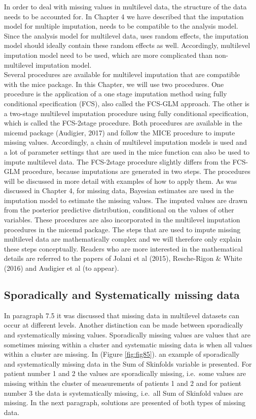 \documentclass[]{book}
\theoremstyle{definition}
\theoremstyle{definition}
\theoremstyle{definition}
\theoremstyle{remark}
\begin{document}
In order to deal with missing values in multilevel data, the structure
of the data needs to be accounted for. In Chapter 4 we have described
that the imputation model for multiple imputation, needs to be
compatible to the analysis model. Since the analysis model for
multilevel data, uses random effects, the imputation model should
ideally contain these random effects as well. Accordingly, multilevel
imputation model need to be used, which are more complicated than
non-multilevel imputation model.\\
Several procedures are available for multilevel imputation that are
compatible with the mice package. In this Chapter, we will use two
procedures. One procedure is the application of a one stage imputation
method using fully conditional specification (FCS), also called the
FCS-GLM approach. The other is a two-stage multilevel imputation
procedure using fully conditional specification, which is called the
FCS-2stage procedure. Both procedures are available in the micemd
package (Audigier, 2017) and follow the MICE procedure to impute missing
values. Accordingly, a chain of multilevel imputation models is used and
a lot of parameter settings that are used in the mice function can also
be used to impute multilevel data. The FCS-2stage procedure slightly
differs from the FCS-GLM procedure, because imputations are generated in
two steps. The procedures will be discussed in more detail with examples
of how to apply them. As was discussed in Chapter 4, for missing data,
Bayesian estimates are used in the imputation model to estimate the
missing values. The imputed values are drawn from the posterior
predictive distribution, conditional on the values of other variables.
These procedures are also incorporated in the multilevel imputation
procedures in the micemd package. The steps that are used to impute
missing multilevel data are mathematically complex and we will therefore
only explain these steps conceptually. Readers who are more interested
in the mathematical details are referred to the papers of Jolani et al
(2015), Resche-Rigon \& White (2016) and Audigier et al (to appear).

\subsection{Sporadically and Systematically missing
data}\label{sporadically-and-systematically-missing-data}

In paragraph 7.5 it was discussed that missing data in multilevel
datasets can occur at different levels. Another distinction can be made
between sporadically and systematically missing values. Sporadically
missing values are values that are sometimes missing within a cluster
and systematic missing data is when all values within a cluster are
missing. In (Figure \ref{fig:fig85}). an example of sporadically and
systematically missing data in the Sum of Skinfolds variable is
presented. For patient number 1 and 2 the values are sporadically
missing, i.e.~some values are missing within the cluster of measurements
of patients 1 and 2 and for patient number 3 the data is systematically
missing, i.e.~all Sum of Skinfold values are missing. In the next
paragraph, solutions are presented of both types of missing data.
\end{document}
